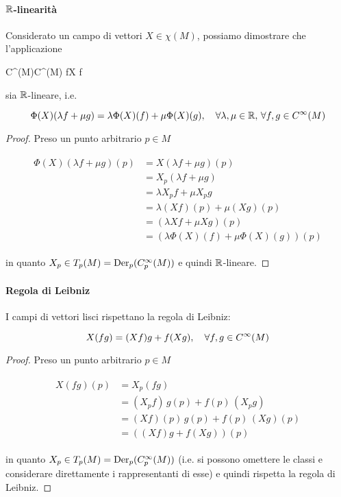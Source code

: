 \paragraph{$ \mathbb{R} $-linearità}

Considerato un campo di vettori $ X \in \chi(M) $, possiamo dimostrare che l'applicazione

	{C^{\infty}(M)}{C^{\infty}(M)}
	{f}{X f}

sia $ \mathbb{R} $-lineare, i.e.

\begin{equation}
	\Phi(X)(\lambda f + \mu g) = \lambda \Phi(X)(f) + \mu \Phi(X)(g) \qcomma \forall \lambda,\mu \in \R, \, \forall f,g \in C^{\infty}(M)
\end{equation}

\begin{proof}
	Preso un punto arbitrario $ p \in M $
	
	\begin{align}
		\begin{split}
			\Phi(X)(\lambda f + \mu g)(p) &= X(\lambda f + \mu g)(p)\\
			&= X_{p}(\lambda f + \mu g)\\
			&= \lambda X_{p} f + \mu X_{p} g\\
			&= \lambda (X f)(p) + \mu (X g)(p)\\
			&= (\lambda X f + \mu X g)(p)\\
			&= (\lambda \Phi(X)(f) + \mu \Phi(X)(g))(p)
		\end{split}
	\end{align}

	in quanto $ X_{p} \in T_{p}(M) = \operatorname{Der}_{p}(C_{p}^{\infty}(M)) $ e quindi $ \mathbb{R} $-lineare.
\end{proof}

\paragraph{Regola di Leibniz}

I campi di vettori lisci rispettano la regola di Leibniz:

\begin{equation}
	X(f g) = (X f) g + f (X g) \qcomma \forall f,g \in C^{\infty}(M)
\end{equation}

\begin{proof}
	Preso un punto arbitrario $ p \in M $
	
	\begin{align}
		\begin{split}
			X(f g)(p) &= X_{p}(f g)\\
			&= (X_{p} f) \, g(p) + f(p) \, (X_{p} g)\\
			&= (X f)(p) \, g(p) + f(p) \, (X g)(p)\\
			&= ((X f) g + f (X g))(p)
		\end{split}
	\end{align}
	
	in quanto $ X_{p} \in T_{p}(M) = \operatorname{Der}_{p}(C_{p}^{\infty}(M)) $ (i.e. si possono omettere le classi e considerare direttamente i rappresentanti di esse) e quindi rispetta la regola di Leibniz.
\end{proof}

